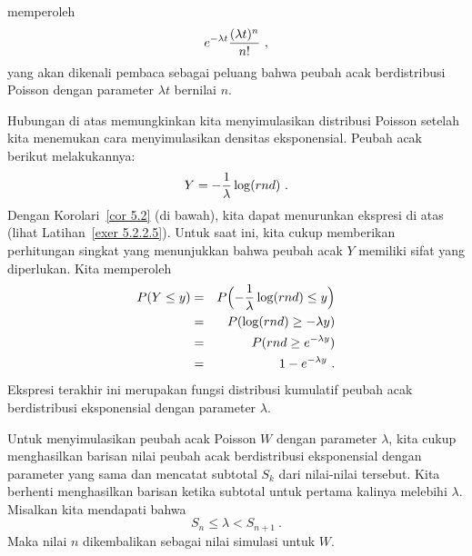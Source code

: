 memperoleh
$$ e^{-\lambda t}{{(\lambda t)^n}\over{n!}}\ ,$$ yang akan dikenali pembaca sebagai
peluang bahwa peubah acak berdistribusi Poisson dengan parameter $\lambda t$
bernilai $n$.
\par Hubungan di atas memungkinkan kita menyimulasikan distribusi Poisson setelah
kita menemukan cara menyimulasikan densitas eksponensial.  Peubah acak berikut
melakukannya:
\begin{equation} Y = -{1\over\lambda} \log(rnd)\ .\label{eq 5.9}
\end{equation} Dengan Korolari~\ref{cor 5.2} (di bawah), kita dapat menurunkan
ekspresi di atas (lihat Latihan~\ref{exer 5.2.2.5}).  Untuk saat ini, kita cukup
memberikan perhitungan singkat yang menunjukkan bahwa peubah acak $Y$ memiliki sifat
yang diperlukan.  Kita memperoleh
\begin{eqnarray*} P(Y \le y) & = & P\Bigl(-{1\over\lambda} \log(rnd) \le y\Bigr) \\ &
= & P(\log(rnd)
\ge -\lambda y) \\ & = & P(rnd \ge e^{-\lambda y}) \\ & = & 1 - e^{-\lambda y}\ . \\
\end{eqnarray*} Ekspresi terakhir ini merupakan fungsi distribusi kumulatif peubah
acak berdistribusi eksponensial dengan parameter $\lambda$.
\par Untuk menyimulasikan peubah acak Poisson $W$ dengan parameter $\lambda$, kita
cukup menghasilkan barisan nilai peubah acak berdistribusi eksponensial dengan
parameter yang sama dan mencatat subtotal $S_k$ dari nilai-nilai tersebut.  Kita
berhenti menghasilkan barisan ketika subtotal untuk pertama kalinya melebihi
$\lambda$.  Misalkan kita mendapati bahwa
$$S_n \le \lambda < S_{n+1}\ .$$ Maka nilai $n$ dikembalikan sebagai nilai simulasi
untuk $W$.


